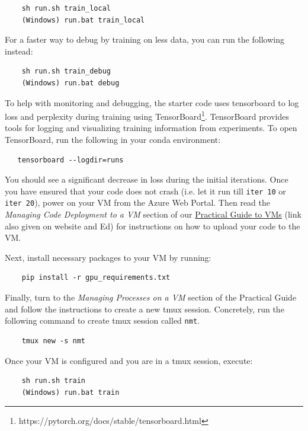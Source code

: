 \begin{lstlisting}
    sh run.sh train_local
    (Windows) run.bat train_local
\end{lstlisting}

For a faster way to debug by training on less data, you can run the following instead:
\begin{lstlisting}
    sh run.sh train_debug
    (Windows) run.bat debug
\end{lstlisting}


To help with monitoring and debugging, the starter code uses tensorboard to log loss and perplexity during training using TensorBoard\footnote{https://pytorch.org/docs/stable/tensorboard.html}. TensorBoard provides tools for logging and visualizing training information from experiments. To open TensorBoard, run the following in your conda environment:

\begin{lstlisting}
   tensorboard --logdir=runs
\end{lstlisting}

You should see a significant decrease in loss during the initial iterations. Once you have ensured that your code does not crash (i.e. let it run till \texttt{iter 10} or \texttt{iter 20}), power on your VM from the Azure Web Portal. Then read the \textit{Managing Code Deployment to a VM} section of our \href{https://docs.google.com/document/d/11kRyfClhTi4-MC1feWWCMI31fHpTzddASsDa48_Dd9E/edit?usp=sharing}{Practical Guide to VMs} (link also given on website and Ed) for instructions on how to upload your code to the VM.

Next, install necessary packages to your VM by running:
    
\begin{lstlisting}
    pip install -r gpu_requirements.txt
\end{lstlisting}

Finally, turn to the \textit{Managing Processes on a VM} section of the Practical Guide and follow the instructions to create a new tmux session. Concretely, run the following command to create tmux session called \texttt{nmt}. 
\begin{lstlisting}
    tmux new -s nmt
\end{lstlisting}


Once your VM is configured and you are in a tmux session, execute:
\begin{lstlisting}
    sh run.sh train
    (Windows) run.bat train
\end{lstlisting}
    
